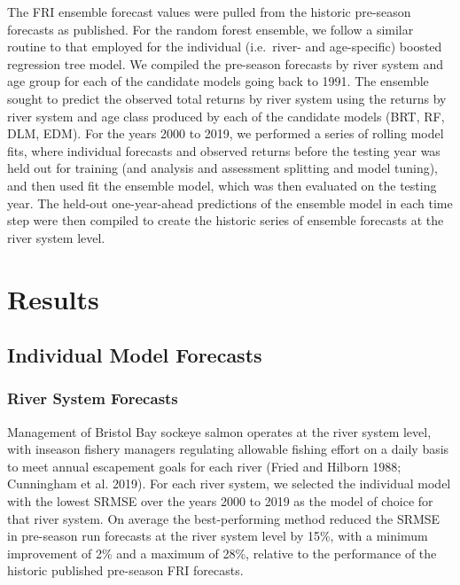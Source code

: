 \documentclass[
]{article}
\begin{document}
The FRI ensemble forecast values were pulled from the historic pre-season forecasts as published. For the random forest ensemble, we follow a similar routine to that employed for the individual (i.e.~river- and age-specific) boosted regression tree model. We compiled the pre-season forecasts by river system and age group for each of the candidate models going back to 1991. The ensemble sought to predict the observed total returns by river system using the returns by river system and age class produced by each of the candidate models (BRT, RF, DLM, EDM). For the years 2000 to 2019, we performed a series of rolling model fits, where individual forecasts and observed returns before the testing year was held out for training (and analysis and assessment splitting and model tuning), and then used fit the ensemble model, which was then evaluated on the testing year. The held-out one-year-ahead predictions of the ensemble model in each time step were then compiled to create the historic series of ensemble forecasts at the river system level.

\hypertarget{results}{%
\section*{Results}\label{results}}

\hypertarget{individual-model-forecasts}{%
\subsection*{Individual Model Forecasts}\label{individual-model-forecasts}}

\hypertarget{river-system-forecasts}{%
\subsubsection*{River System Forecasts}\label{river-system-forecasts}}

Management of Bristol Bay sockeye salmon operates at the river system level, with inseason fishery managers regulating allowable fishing effort on a daily basis to meet annual escapement goals for each river (Fried and Hilborn 1988; Cunningham et al. 2019). For each river system, we selected the individual model with the lowest SRMSE over the years 2000 to 2019 as the model of choice for that river system. On average the best-performing method reduced the SRMSE in pre-season run forecasts at the river system level by 15\%, with a minimum improvement of 2\% and a maximum of 28\%, relative to the performance of the historic published pre-season FRI forecasts.
\end{document}
